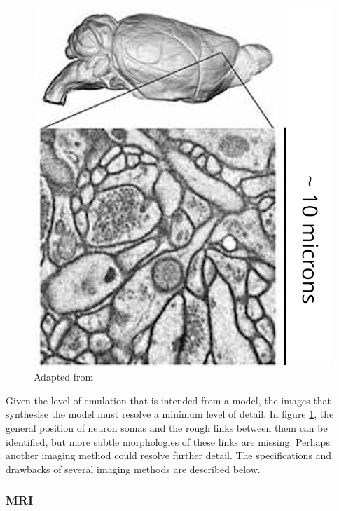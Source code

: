 \begin{figure}[h]
    \centering
    \includegraphics[scale=2]{figures/images/enlarge.jpg}
    {Adapted from \cite[fig. 1]{mikula_progress_2016}}
    \label{scaleexample}
\end{figure}
\vspace{1ex}

Given the level of emulation that is intended from a model, the images that
synthesise the model must resolve a minimum level of detail. In figure
\ref{scaleexample}, the general position of neuron somas and the rough links
between them can be identified, but more subtle morphologies of these links are
missing. Perhaps another imaging method could resolve further detail. The
specifications and drawbacks of several imaging methods are described below.

\subsubsection*{MRI}

